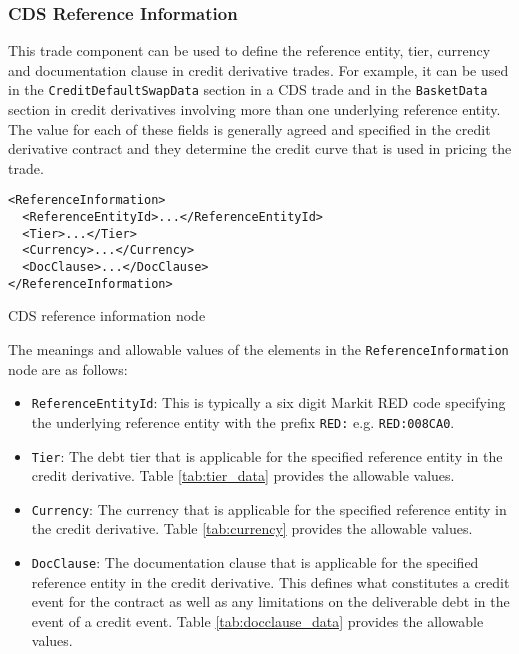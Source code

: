 \subsubsection{CDS Reference Information}
\label{ss:cds_reference_information} 

This trade component can be used to define the reference entity, tier, currency and documentation clause in credit derivative trades. For example, it can be used in the \lstinline!CreditDefaultSwapData! section in a CDS trade and in the \lstinline!BasketData! section in credit derivatives involving more than one underlying reference entity. The value for each of these fields is generally agreed and specified in the credit derivative contract and they determine the credit curve that is used in pricing the trade.

\begin{listing}[H]
\begin{verbatim}
<ReferenceInformation>
  <ReferenceEntityId>...</ReferenceEntityId>
  <Tier>...</Tier>
  <Currency>...</Currency>
  <DocClause>...</DocClause>
</ReferenceInformation>
\end{verbatim}
\caption{CDS reference information node}
\label{lst:cds_reference_information}
\end{listing}

The meanings and allowable values of the elements in the \lstinline!ReferenceInformation! node are as follows:

\begin{itemize}

\item \lstinline!ReferenceEntityId!:
This is typically a six digit Markit RED code specifying the underlying reference entity with the prefix \lstinline!RED:! e.g. \lstinline!RED:008CA0!.

\item \lstinline!Tier!:
The debt tier that is applicable for the specified reference entity in the credit derivative. Table \ref{tab:tier_data} provides the allowable values.

\item \lstinline!Currency!:
The currency that is applicable for the specified reference entity in the credit derivative. Table \ref{tab:currency} provides the allowable values.

\item \lstinline!DocClause!:
The documentation clause that is applicable for the specified reference entity in the credit derivative. This defines what constitutes a credit event for the contract as well as any limitations on the deliverable debt in the event of a credit event. Table \ref{tab:docclause_data} provides the allowable values.

\end{itemize}

